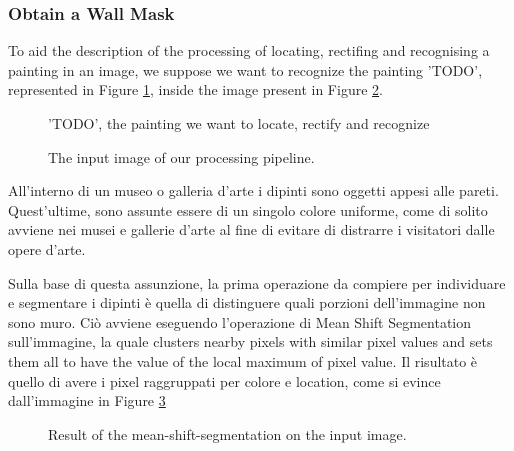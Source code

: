 \documentclass[10pt,twocolumn,letterpaper]{article}
\begin{document}
\subsubsection{Obtain a Wall Mask}

To aid the description of the processing of locating, rectifing and recognising a painting in an image, we suppose we want to recognize the painting 'TODO', represented in Figure \ref{fig:dbPainting}, inside the image present in Figure \ref{fig:originalImage}.

\begin{figure}[t]
   \begin{center}
   \fbox{\rule{0pt}{2in} \rule{0.9\linewidth}{0pt}}
   \end{center}
      \caption{'TODO', the painting we want to locate, rectify and recognize}
   \label{fig:dbPainting}
   \end{figure}

\begin{figure}[t]
   \begin{center}
   \fbox{\rule{0pt}{2in} \rule{0.9\linewidth}{0pt}}
   \end{center}
      \caption{The input image of our processing pipeline.}
   \label{fig:originalImage}
\end{figure}

All'interno di un museo o galleria d'arte i dipinti sono oggetti appesi alle pareti. Quest'ultime, sono assunte essere di un singolo colore uniforme, come di solito avviene nei musei e gallerie d'arte al fine di evitare di distrarre i visitatori dalle opere d'arte. 

Sulla base di questa assunzione, la prima operazione da compiere per individuare e segmentare i dipinti è quella di distinguere quali porzioni dell'immagine non sono muro. Ciò avviene eseguendo l'operazione di Mean Shift Segmentation sull'immagine, la quale clusters nearby pixels with similar pixel values and sets them all to have the value of the local maximum of pixel value. Il risultato è quello di avere i pixel raggruppati per colore e location, come si evince dall'immagine in Figure \ref{fig:meanShiftSegmentation}

\begin{figure}[t]
   \begin{center}
   \fbox{\rule{0pt}{2in} \rule{0.9\linewidth}{0pt}}
   \end{center}
      \caption{Result of the mean-shift-segmentation on the input image.}
   \label{fig:meanShiftSegmentation}
\end{figure}
\end{document}
